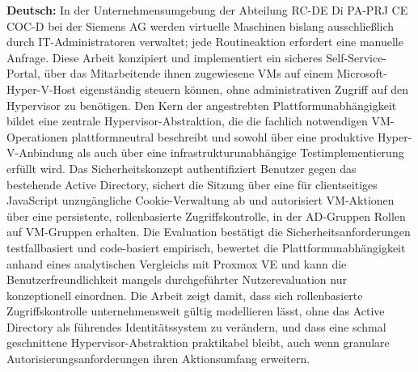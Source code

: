 \documentclass[12pt,a4paper]{article}
\begin{document}
\noindent\textbf{Deutsch:}
In der Unternehmensumgebung der Abteilung RC-DE Di PA-PRJ CE COC-D bei der Siemens AG werden virtuelle Maschinen bislang ausschließlich durch IT-Administratoren verwaltet; jede Routineaktion erfordert eine manuelle Anfrage. Diese Arbeit konzipiert und implementiert ein sicheres Self-Service-Portal, über das Mitarbeitende ihnen zugewiesene VMs auf einem Microsoft-Hyper-V-Host eigenständig steuern können, ohne administrativen Zugriff auf den Hypervisor zu benötigen. Den Kern der angestrebten Plattformunabhängigkeit bildet eine zentrale Hypervisor-Abstraktion, die die fachlich notwendigen VM-Operationen plattformneutral beschreibt und sowohl über eine produktive Hyper-V-Anbindung als auch über eine infrastrukturunabhängige Testimplementierung erfüllt wird. Das Sicherheitskonzept authentifiziert Benutzer gegen das bestehende Active Directory, sichert die Sitzung über eine für clientseitiges JavaScript unzugängliche Cookie-Verwaltung ab und autorisiert VM-Aktionen über eine persistente, rollenbasierte Zugriffskontrolle, in der AD-Gruppen Rollen auf VM-Gruppen erhalten. Die Evaluation bestätigt die Sicherheitsanforderungen testfallbasiert und code-basiert empirisch, bewertet die Plattformunabhängigkeit anhand eines analytischen Vergleichs mit Proxmox VE und kann die Benutzerfreundlichkeit mangels durchgeführter Nutzerevaluation nur konzeptionell einordnen. Die Arbeit zeigt damit, dass sich rollenbasierte Zugriffskontrolle unternehmensweit gültig modellieren lässt, ohne das Active Directory als führendes Identitätssystem zu verändern, und dass eine schmal geschnittene Hypervisor-Abstraktion praktikabel bleibt, auch wenn granulare Autorisierungsanforderungen ihren Aktionsumfang erweitern.
\end{document}
